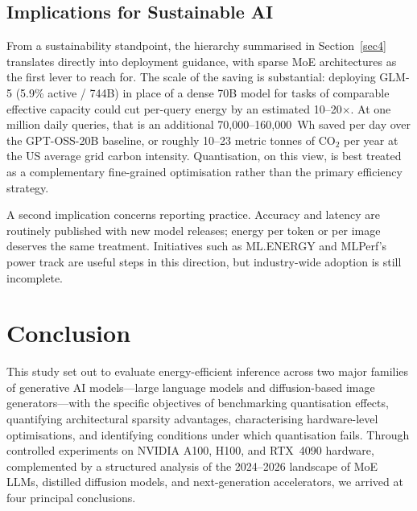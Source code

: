 \documentclass[AMS,STIX2COL]{WileyNJD-v2}
\begin{document}
\subsection{Implications for Sustainable AI}

From a sustainability standpoint, the hierarchy summarised in Section~\ref{sec4} translates directly into deployment guidance, with sparse MoE architectures as the first lever to reach for. The scale of the saving is substantial: deploying GLM-5 (5.9\% active / 744B) in place of a dense 70B model for tasks of comparable effective capacity could cut per-query energy by an estimated 10--20$\times$. At one million daily queries, that is an additional 70,000--160,000~Wh saved per day over the GPT-OSS-20B baseline, or roughly 10--23 metric tonnes of CO$_2$ per year at the US average grid carbon intensity. Quantisation, on this view, is best treated as a complementary fine-grained optimisation rather than the primary efficiency strategy.

A second implication concerns reporting practice. Accuracy and latency are routinely published with new model releases; energy per token or per image deserves the same treatment. Initiatives such as ML.ENERGY \cite{mlenergy2025} and MLPerf's power track \cite{mlperf2025inference} are useful steps in this direction, but industry-wide adoption is still incomplete.


\section{Conclusion}\label{sec6}

This study set out to evaluate energy-efficient inference across two major families of generative AI models---large language models and diffusion-based image generators---with the specific objectives of benchmarking quantisation effects, quantifying architectural sparsity advantages, characterising hardware-level optimisations, and identifying conditions under which quantisation fails. Through controlled experiments on NVIDIA A100, H100, and RTX~4090 hardware, complemented by a structured analysis of the 2024--2026 landscape of MoE LLMs, distilled diffusion models, and next-generation accelerators, we arrived at four principal conclusions.
\end{document}
